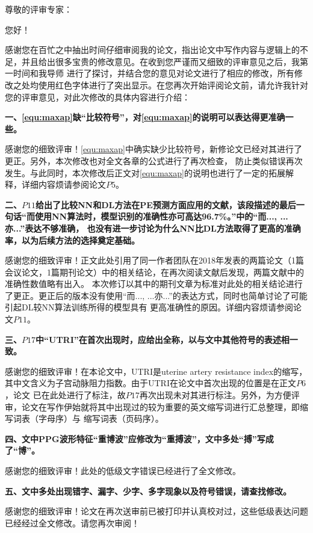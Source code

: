 \cleardoublepage
{}
\noindent
尊敬的评审专家：

您好！

感谢您在百忙之中抽出时间仔细审阅我的论文，指出论文中写作内容与逻辑上的不足，并且给出很多宝贵的修改意见。在收到您严谨而又细致的评审意见之后，我第一时间和我导师
进行了探讨，并结合您的意见对论文进行了相应的修改，所有修改之处均使用红色字体进行了突出显示。在您再次开始评阅论文前，请允许我针对您的评审意见，对此次修改的具体内容进行介绍：

\textbf{一、\autoref{equ:maxap}缺“比较符号”，对\autoref{equ:maxap}的说明可以表达得更准确一些。}

感谢您的细致评审！\autoref{equ:maxap}中确实缺少比较符号，新修论文已经对其进行了更正。另外，本次修改也对全文各章的公式进行了再次检查，
防止类似错误再次发生。与此同时，本次修改后正文对\autoref{equ:maxap}的说明也进行了一定的拓展解释，详细内容烦请参阅论文$P5$。

\textbf{二、$P11$给出了比较NN和DL方法在PE预测方面应用的文献，该段描述的最后一句话“而使用NN算法时，模型识别的准确性亦可高达96.7\%。”中的“而..., ...亦...”表达不够准确，
也没有进一步讨论为什么NN比DL方法取得了更高的准确率，以为后续方法的选择奠定基础。}

感谢您的细致评审！正文此处引用了同一作者团队在2018年发表的两篇论文（1篇会议论文，1篇期刊论文）中的相关结论，在再次阅读文献后发现，两篇文献中的准确性数值略有出入。
本次修订以其中的期刊文章为标准对此处的相关结论进行了更正。更正后的版本没有使用“而..., ...亦...”的表达方式，同时也简单讨论了可能引起DL较NN算法训练所得的模型具有
更高准确性的原因。详细内容烦请参阅论文$P11$。

\textbf{三、$P17$中“UTRI”在首次出现时，应给出全称，以与文中其他符号的表述相一致。}

感谢您的细致评审！在本论文中，UTRI是uterine artery resistance index的缩写，其中文含义为子宫动脉阻力指数。由于UTRI在论文中首次出现的位置是在正文$P6$，论文
已在此处进行了标注，故$P17$再次出现未对其进行标注。另外，为方便评审，论文在写作伊始就将其中出现过的较为重要的英文缩写词进行汇总整理，即缩写词表（字母序）与
缩写词表（页码序）。

\textbf{四、文中PPG波形特征“重博波”应修改为“重搏波”，文中多处“搏”写成了“博”。}

感谢您的细致评审！此处的低级文字错误已经进行了全文修改。

\textbf{五、文中多处出现错字、漏字、少字、多字现象以及符号错误，请查找修改。}

感谢您的细致评审！论文在再次送审前已被打印并认真校对过，这些低级表达问题已经经过全文修改。请您再次审阅！

